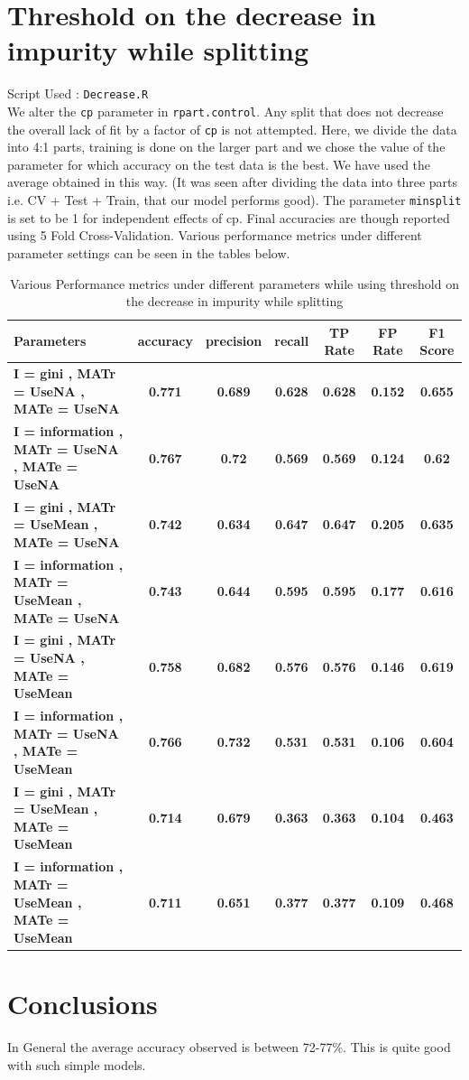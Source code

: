 \documentclass[12pt]{article}%
\begin{document}
\section{Threshold on the decrease in impurity while splitting}
Script Used : {\tt Decrease.R} \\ 
We alter the {\tt cp} parameter in {\tt rpart.control}. Any split that does not decrease the overall lack of fit by a factor of {\tt cp} is not attempted. 
Here, we divide the data into 4:1 parts, training is done on the larger part and we chose the value of the parameter for which accuracy on the test data is the best. We have used the average obtained in this way. (It was seen after dividing the data into three parts i.e. CV +  Test +  Train, that our model performs good). The parameter {\tt minsplit} is set to be 1 for independent effects of cp. Final accuracies are though reported using 5 Fold Cross-Validation. Various performance metrics under different parameter settings can be seen in the tables below. 
\begin{center}
\begin{table}
\centering
\label{table:prune}
\caption{Various Performance metrics under different parameters while using threshold on the decrease in impurity while splitting}
\begin{tabular}{|p{2in}|c|c|c|c|c|c|}
 \hline
 {\bf Parameters } & {\bf accuracy } & {\bf precision } & {\bf recall } & {\bf TP Rate } & {\bf FP Rate } & {\bf F1 Score } \\ \hline
 {\bf I = gini , MATr = UseNA , MATe = UseNA  } & {\bf 0.771 } & {\bf 0.689 } & {\bf 0.628 } & {\bf 0.628 } & {\bf 0.152 } & {\bf 0.655 } \\ \hline
 {\bf I = information , MATr = UseNA , MATe = UseNA  } & {\bf 0.767 } & {\bf 0.72 } & {\bf 0.569 } & {\bf 0.569 } & {\bf 0.124 } & {\bf 0.62 } \\ \hline
 {\bf I = gini , MATr = UseMean , MATe = UseNA  } & {\bf 0.742 } & {\bf 0.634 } & {\bf 0.647 } & {\bf 0.647 } & {\bf 0.205 } & {\bf 0.635 } \\ \hline
 {\bf I = information , MATr = UseMean , MATe = UseNA  } & {\bf 0.743 } & {\bf 0.644 } & {\bf 0.595 } & {\bf 0.595 } & {\bf 0.177 } & {\bf 0.616 } \\ \hline
{\bf I = gini , MATr = UseNA , MATe = UseMean  } & {\bf 0.758 } & {\bf 0.682 } & {\bf 0.576 } & {\bf 0.576 } & {\bf 0.146 } & {\bf 0.619 } \\ \hline
{\bf I = information , MATr = UseNA , MATe = UseMean  } & {\bf 0.766 } & {\bf 0.732 } & {\bf 0.531 } & {\bf 0.531 } & {\bf 0.106 } & {\bf 0.604 } \\ \hline
{\bf I = gini , MATr = UseMean , MATe = UseMean  } & {\bf 0.714 } & {\bf 0.679 } & {\bf 0.363 } & {\bf 0.363 } & {\bf 0.104 } & {\bf 0.463 } \\ \hline
{\bf I = information , MATr = UseMean , MATe = UseMean  } & {\bf 0.711 } & {\bf 0.651 } & {\bf 0.377 } & {\bf 0.377 } & {\bf 0.109 } & {\bf 0.468 } \\ \hline
\end{tabular}
\end{table}
\end{center}

\section{Conclusions}
In General the average accuracy observed is between 72-77\%. This is quite good with such simple models.
\end{document}
